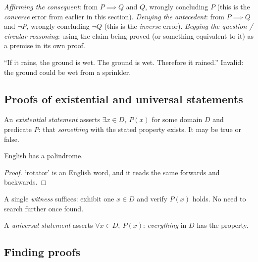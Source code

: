 \begin{note}
\emph{Affirming the consequent}: from $P\implies Q$ and $Q$, wrongly concluding $P$ (this is the \emph{converse} error from earlier in this section). \emph{Denying the antecedent}: from $P\implies Q$ and $\neg P$, wrongly concluding $\neg Q$ (this is the \emph{inverse} error). \emph{Begging the question / circular reasoning}: using the claim being proved (or something equivalent to it) as a premise in its own proof.
\end{note}

\begin{example}
``If it rains, the ground is wet. The ground is wet. Therefore it rained.'' Invalid: the ground could be wet from a sprinkler.
\end{example}

\subsection{Proofs of existential and universal statements}
\label{sec:3-3}

\begin{definition}
An \emph{existential statement} asserts $\exists x \in D,\ P(x)$ for some domain $D$ and predicate $P$: that \emph{something} with the stated property exists. It may be true or false.
\end{definition}

\begin{example}
English has a palindrome.
\end{example}
\begin{proof}
`rotator' is an English word, and it reads the same forwards and backwards.
\end{proof}

\begin{note}
A single \emph{witness} suffices: exhibit one $x \in D$ and verify $P(x)$ holds. No need to search further once found.
\end{note}

\begin{definition}
A \emph{universal statement} asserts $\forall x \in D,\ P(x)$: \emph{everything} in $D$ has the property.
\end{definition}

\subsection{Finding proofs}
\label{sec:3-4}

